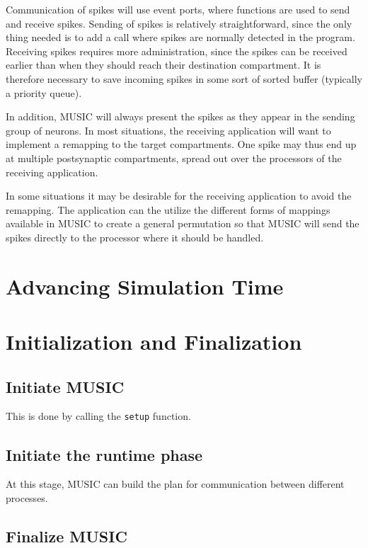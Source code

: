 \documentclass[a4paper]{report}
\begin{document}
Communication of spikes will use event ports, where functions are used
to send and receive spikes.  Sending of spikes is relatively
straightforward, since the only thing needed is to add a call where
spikes are normally detected in the program.  Receiving spikes
requires more administration, since the spikes can be received earlier
than when they should reach their destination compartment.  It is
therefore necessary to save incoming spikes in some sort of sorted
buffer (typically a priority queue).

In addition, MUSIC will always present the spikes as they appear in
the sending group of neurons.  In most situations, the receiving
application will want to implement a remapping to the target
compartments.  One spike may thus end up at multiple postsynaptic
compartments, spread out over the processors of the receiving
application.

In some situations it may be desirable for the receiving application
to avoid the remapping.  The application can the utilize the different
forms of mappings available in MUSIC to create a general permutation
so that MUSIC will send the spikes directly to the processor where it
should be handled.


\section{Advancing Simulation Time}


\section{Initialization and Finalization}

\subsection{Initiate MUSIC}

  This is done by calling the \lstinline!setup! function.

\subsection{Initiate the runtime phase}

  At this stage, MUSIC can build the plan for communication between
  different processes.

\subsection{Finalize MUSIC}
\end{document}
